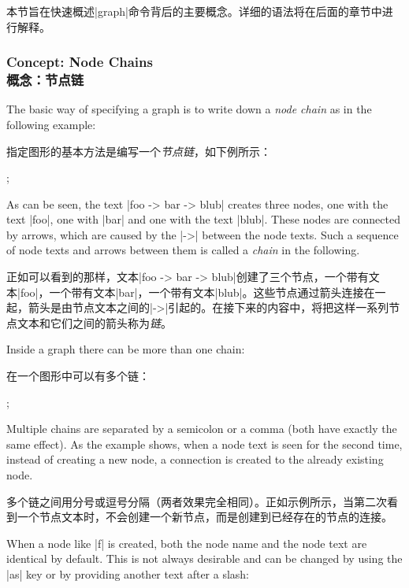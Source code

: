 本节旨在快速概述|graph|命令背后的主要概念。详细的语法将在后面的章节中进行解释。


\subsubsection{Concept: Node Chains\\概念：节点链}

The basic way of specifying a graph is to write down a \emph{node chain} as in
the following example:

指定图形的基本方法是编写一个\emph{节点链}，如下例所示：
\begin{codeexample}[preamble={\usetikzlibrary{graphs}}]
\tikz [every node/.style = draw]
  ;
\end{codeexample}

As can be seen, the text |foo -> bar -> blub| creates three nodes, one with
the text |foo|, one with |bar| and one with the text |blub|. These nodes are
connected by arrows, which are caused by the |->| between the node texts. Such
a sequence of node texts and arrows between them is called a \emph{chain} in
the following.

正如可以看到的那样，文本|foo -> bar -> blub|创建了三个节点，一个带有文本|foo|，一个带有文本|bar|，一个带有文本|blub|。这些节点通过箭头连接在一起，箭头是由节点文本之间的|->|引起的。在接下来的内容中，将把这样一系列节点文本和它们之间的箭头称为\emph{链}。

Inside a graph there can be more than one chain:

在一个图形中可以有多个链：
%
\begin{codeexample}[preamble={\usetikzlibrary{graphs}}]
\tikz {};
\end{codeexample}

Multiple chains are separated by a semicolon or a comma (both have exactly the
same effect). As the example shows, when a node text is seen for the second
time, instead of creating a new node, a connection is created to the already
existing node.

多个链之间用分号或逗号分隔（两者效果完全相同）。正如示例所示，当第二次看到一个节点文本时，不会创建一个新节点，而是创建到已经存在的节点的连接。

When a node like |f| is created, both the node name and the node text are
identical by default. This is not always desirable and can be changed by using
the |as| key or by providing another text after a slash:

